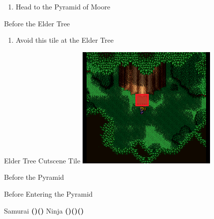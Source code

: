 \begin{paracol}{2}
\switchcolumn*
\begin{enumerate}[resume]
    \item Head to the Pyramid of Moore
\end{enumerate}

\switchcolumn
\begin{steproute}{Before the Elder Tree}
\end{steproute}

\switchcolumn*
\begin{enumerate}[resume]
    \item Avoid this tile at the Elder Tree
\end{enumerate}

\switchcolumn
\begin{misc}{Elder Tree Cutscene Tile}
    \includegraphics[scale=0.626]{../Graphics/Misc/19. Elder Tree Cutscene Tile.png}
\end{misc}

\switchcolumnTwice[*]
\begin{steproute}{Before the Pyramid}
\end{steproute}

\switchcolumn
\begin{menu}{Before Entering the Pyramid}
    \varwb
    \begin{jobMenu}
        \cara Samurai \textbf{(\pointLeft)(\pointDown)} \ability{\dash} \optimize
        \faris Ninja \textbf{(\pointLeft)(\pointDown)(\pointLeft) \ability{!\gilToss}}
    \end{jobMenu}
    \begin{itemMenu}
        \hiPotionMenu {}
    \end{itemMenu}
    \varwe
\end{menu}

\end{paracol}